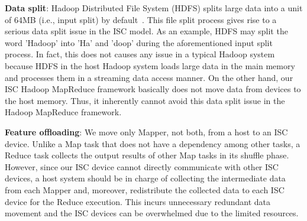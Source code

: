 

\textbf{Data split}: Hadoop Distributed File System (HDFS) splits large data into a unit of 64MB (i.e., input split) by default~\cite{TomWhite:HadoopDefinitiveGuide:2012}. This file split process gives rise to a serious data split issue in the ISC model. As an example, HDFS may split the word 'Hadoop' into 'Ha' and 'doop' during the aforementioned input split process. In fact, this does not causes any issue in a typical Hadoop system because HDFS in the host Hadoop system loads large data in the main memory and processes them in a streaming data access manner. On the other hand, our ISC Hadoop MapReduce framework basically does not move data from devices to the host memory. Thus, it inherently cannot avoid this data split issue in the Hadoop MapReduce framework. %



\textbf{Feature offloading}: We move only Mapper, not both, from a host to an ISC device. Unlike a Map task that does not have a dependency among other tasks, a Reduce task collects the output results of other Map tasks in its shuffle phase. However, since our ISC device cannot directly communicate with other ISC devices, a host system should be in charge of collecting the intermediate data from each Mapper and, moreover, redistribute the collected data to each ISC device for the Reduce execution. This incurs unnecessary redundant data movement and the ISC devices can be overwhelmed due to the limited resources.

